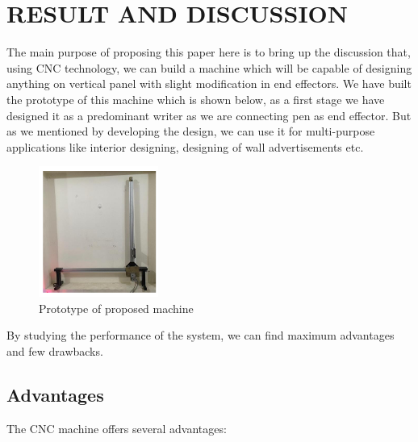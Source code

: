 \documentclass[conference]{IEEEtran}
\begin{document}
\vspace{90pt}

\section{RESULT AND DISCUSSION}

The main purpose of proposing this paper here is to bring up
the discussion that, using CNC technology, we can build a
machine which will be capable of designing anything on
vertical panel with slight modification in end effectors. We
have built the prototype of this machine which is shown below,
as a first stage we have designed it as a predominant writer as
we are connecting pen as end effector. But as we mentioned by
developing the design, we can use it for multi-purpose
applications like interior designing, designing of wall
advertisements etc.

\begin{figure}[h]
    \centering
    \includegraphics[width=0.35\textwidth]{prototype.png}
    \caption{Prototype of proposed machine}
\end{figure}

\vspace{5pt}
By studying the performance of the system, we can find
maximum advantages and few drawbacks.

\vspace{5pt}

\subsection*{\textbf{Advantages}}

\vspace*{5pt}
The CNC machine offers several advantages:
\end{document}
